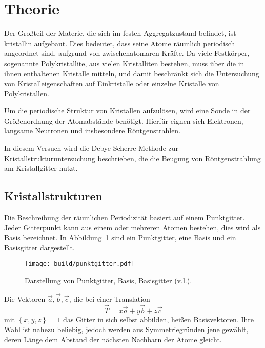 \section{Theorie}\label{sec:Theorie}
\nocite{anleitung}

Der Großteil der Materie, die sich im festen Aggregatzustand befindet,
ist kristallin aufgebaut.
Dies bedeutet, dass seine Atome räumlich periodisch angeordnet sind,
aufgrund von zwischenatomaren Kräfte.
Da viele Festkörper, sogenannte Polykristallite, aus vielen Kristalliten bestehen,
muss über die in ihnen enthaltenen Kristalle mitteln, und damit beschränkt sich die
Untersuchung von Kristalleigenschaften auf Einkristalle oder einzelne Kristalle
von Polykristallen.

Um die periodische Struktur von Kristallen aufzulösen, wird eine Sonde in der
Größenordnung der Atomabstände benötigt.
Hierfür eignen sich Elektronen, langsame Neutronen und insbesondere Röntgenstrahlen.

In diesem Versuch wird die Debye-Scherre-Methode zur Kristallstrukturuntersuchung beschrieben,
die die Beugung von Röntgenstrahlung am Kristallgitter nutzt.

\subsection{Kristallstrukturen}%
\label{sub:kristallstrukturen}
Die Beschreibung der räumlichen Periodizität basiert auf einem Punktgitter.
Jeder Gitterpunkt kann aus einem oder mehreren Atomen bestehen,
dies wird als Basis bezeichnet.
In Abbildung~\ref{fig:punktgitter} sind ein Punktgitter, eine Basis und ein Basisgitter
dargestellt.
\begin{figure}
  \centering
  \texttt{[image: build/punktgitter.pdf]}
  \caption{Darstellung von Punktgitter, Basis, Basisgitter (v.l.).\cite{anleitung}}%
  \label{fig:punktgitter}
\end{figure}

Die Vektoren $\vec{a}, \vec{b}, \vec{c}$, die bei einer Translation
\begin{equation}
  \vec{T} = x\vec{a} + y\vec{b} + z\vec{c}
\end{equation}
mit $\left\{x, y, z\right\} = 1$ das Gitter in sich selbst abbilden, heißen Basisvektoren.
Ihre Wahl ist nahezu beliebig, jedoch werden aus Symmetriegründen jene gewählt,
deren Länge dem Abstand der nächsten Nachbarn der Atome gleicht.

